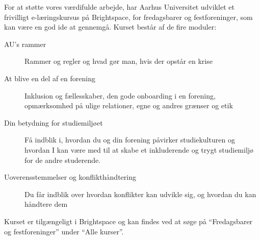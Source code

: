 For at støtte vores værdifulde arbejde, har Aarhus Universitet 
udviklet et frivilligt e-læringskursus på Brightspace,
for fredagsbarer og festforeninger, som kan være en god ide at gennemgå.
Kurset består af de fire moduler:
\begin{description}
    \item[AU's rammer] Rammer og regler og hvad gør man, hvis der opstår en krise
    \item[At blive en del af en forening] Inklusion og fællesskaber, den gode 
    onboarding i en forening, opmærksomhed på ulige relationer, egne og andres grænser og etik
    \item[Din betydning for studiemiljøet] Få indblik i, hvordan du og din forening påvirker 
    studiekulturen og hvordan I kan være med til at skabe et inkluderende og 
    trygt studiemiljø for de andre studerende.
    \item [Uoverensstemmelser og konflikthåndtering] Du får indblik over hvordan konflikter 
    kan udvikle sig, og hvordan du kan håndtere dem
\end{description}
Kurset er tilgængeligt i Brightspace og kan findes ved at søge 
på ``Fredagsbarer og festforeninger'' under ``Alle kurser''.

\printindex


